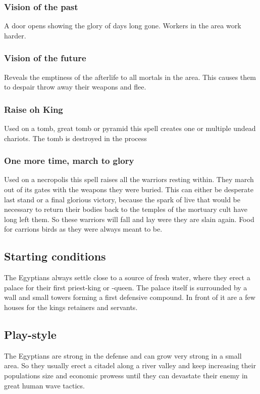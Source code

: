 \documentclass[a4paper]{book}
\begin{document}
		\subsubsection{Vision of the past}
			A door opens showing the glory of days long gone.
			Workers in the area work harder.

		\subsubsection{Vision of the future}
			Reveals the emptiness of the afterlife to all mortals in the area.
			This causes them to despair throw away their weapons and flee.

		\subsubsection{Raise oh King}
			Used on a tomb, great tomb or pyramid this spell creates one or multiple undead chariots.
			The tomb is destroyed in the process

		\subsubsection{One more time, march to glory}
			Used on a necropolis this spell raises all the warriors resting within.
			They march out of its gates with the weapons they were buried.
			This can either be desperate last stand or a final glorious victory,
			because the spark of live that would be necessary
			to return their bodies back to the temples of the mortuary cult
			have long left them.
			So these warriors will fall and lay were they are slain again.
			Food for carrions birds as they were always meant to be.

	\subsection{Starting conditions}
		The \gls{Egyptians} always settle close to a source of fresh water,
		where they erect a palace for their first priest-king or -queen.
		The palace itself is surrounded by a wall and small towers forming a first defensive compound.
		In front of it are a few houses for the kings retainers and servants.

	\subsection{Play-style}
		The \gls{Egyptians} are strong in the defense and can grow very strong in a small area.
		So they usually erect a citadel along a river valley and keep increasing
		their populations size and economic prowess until they can devastate their enemy 
		in great human wave tactics.
\end{document}
